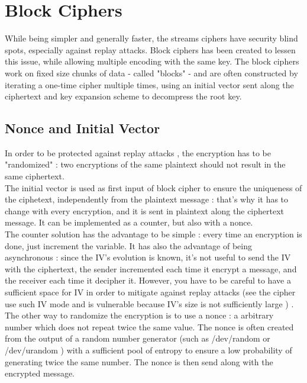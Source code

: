 \section{ Block Ciphers }

While being simpler and generally faster, the streams ciphers have security blind spots, especially against replay attacks. Block ciphers has been created to lessen this issue, while allowing multiple encoding with the same key. The block ciphers work on fixed size chunks of data - called "blocks" - and are often constructed by iterating a one-time cipher multiple times, using an initial vector sent along the ciphertext and key expansion scheme to decompress the root key.


\subsection{Nonce and Initial Vector}

In order to be protected against replay attacks , the encryption has to be "randomized" : two encryptions of the same plaintext should not result in the same ciphertext. \\
The initial vector is used as first input of block cipher to ensure the uniqueness of the ciphetext, independently from the plaintext message : that's why it has to change with every encryption, and it is sent in plaintext along the ciphertext message. It can be implemented as a counter, but also with  a nonce.\\
The counter solution has the advantage to be simple : every time an encryption is done, just increment the variable. It has also the advantage of being asynchronous : since the IV's evolution is known, it's not useful to send the IV with the ciphertext, the sender incremented each time it encrypt a message, and the receiver each time it decipher it. However, you have to be careful to have a sufficient space for IV in order to mitigate against replay attacks (see the \cite{WEP} cipher use such IV mode and is vulnerable because IV's size is not sufficiently large )  . \\
The other way to randomize the encryption is to use a nonce : a arbitrary number which does not repeat twice the same value. The nonce is often created from the output of a random number generator (such as /dev/random or /dev/urandom ) with a sufficient pool of entropy to ensure a low probability of generating twice the same number. The nonce is then send along with the encrypted message. 

